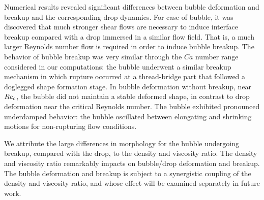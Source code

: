 \documentclass[review]{elsarticle}
\begin{document}
Numerical results revealed significant differences between bubble deformation
and breakup and the corresponding drop dynamics.  For case of bubble, it was
discovered that much stronger shear flows are necessary to induce interface
breakup compared with a drop immersed in a similar flow field.  That is, a much
larger Reynolds number flow is required in order to induce bubble breakup.  The
behavior of bubble breakup was very similar through the $Ca$ number range
considered in our computations: the bubble underwent a similar breakup
mechanism in which rupture occurred at a thread-bridge part that followed a
doglegged shape formation stage.  In bubble deformation without breakup, near
$Re_{\rm c}$, the bubble did not maintain a stable deformed shape, in contrast to
drop deformation near the critical Reynolds number.  The bubble exhibited
pronounced underdamped behavior: the bubble oscillated between elongating and
shrinking motions for non-rupturing flow conditions.

We attribute the large differences in morphology for the bubble undergoing
breakup, compared with the drop, to the density and viscosity ratio.  The
density and viscosity ratio remarkably impacts on bubble/drop deformation and
breakup.  The bubble deformation and breakup is subject to a synergistic
coupling of the density and viscosity ratio, and whose effect will be examined
separately in future work.


 


\end{document}
